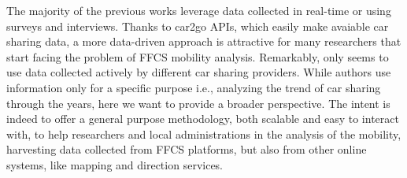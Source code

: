 The majority of the previous works \cite{Herrmann2014,Schulte2015,Wagner2015,Schmoller2015,Kopp2015,Wang2017,Kortum2016} leverage data collected in real-time or using surveys and interviews. Thanks to car2go APIs, which easily make avaiable car sharing data, a more data-driven approach is attractive for many researchers that start facing the problem of FFCS mobility analysis. Remarkably, only \cite{Kortum2016} seems to use data collected actively by different car sharing providers. While authors use information only for a specific purpose i.e., analyzing the trend of car sharing through the years, here we want to provide a broader perspective.
The intent is indeed to offer a general purpose methodology, both scalable and easy to interact with, to help researchers and local administrations in the analysis of the mobility, harvesting data collected from FFCS platforms, but also from other online systems, like mapping and direction services. 
